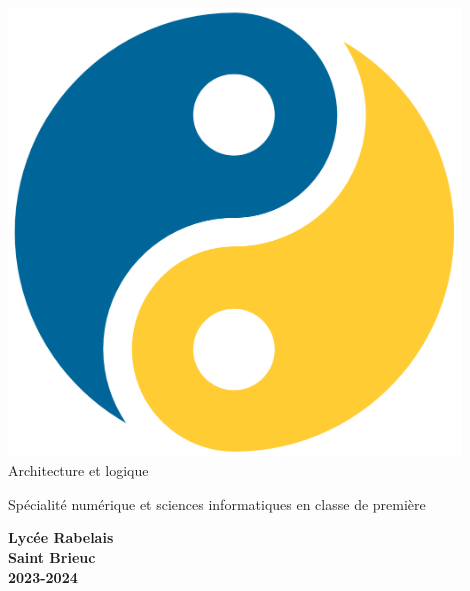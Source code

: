 \begin{titlepage}
    \begin{center}
        \includegraphics[width=12cm]{titlepage/img/yin_yang_python}\\[2em]

        {\bigtitlefont \large\color{gray} Architecture et logique}

        {\titlefont\Large\color{gray} Spécialité numérique et sciences informatiques en classe de première\\[2em]}

        {\color{gray}\textbf{Lycée Rabelais\\ Saint Brieuc\\ 2023-2024}}
    \end{center}
\end{titlepage}